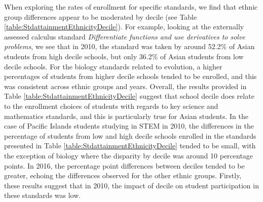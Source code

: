 \documentclass[a4paper]{article}
\begin{document}
When exploring the rates of enrollment for specific standards, we find that ethnic group differences appear to be moderated by decile (see Table \ref{table:StdattainmentEthnicityDecile}). For example, looking at the externally assessed calculus standard \textit{Differentiate functions and use derivatives to solve problems}, we see that in 2010, the standard was taken by around 52.2\% of Asian students from high decile schools, but only 36.2\% of Asian students from low decile schools. For the biology standards related to evolution, a higher percentages of students from higher decile schools tended to be enrolled, and this was consistent across ethnic groups and years. Overall, the results provided in Table \ref{table:StdattainmentEthnicityDecile} suggest that school decile does relate to the enrollment choices of students with regards to key science and mathematics standards, and this is particularly true for Asian students. In the case of Pacific Islands students studying in STEM in 2010, the differences in the percentage of students from low and high decile schools enrolled in the standards presented in Table \ref{table:StdattainmentEthnicityDecile} tended to be small, with the exception of biology where the disparity by decile was around 10 percentage points. In 2016, the percentage point differences between deciles tended to be greater, echoing the differences observed for the other ethnic groups. Firstly, these results suggest that in 2010, the impact of decile on student participation in these standards was low. 
\end{document}
